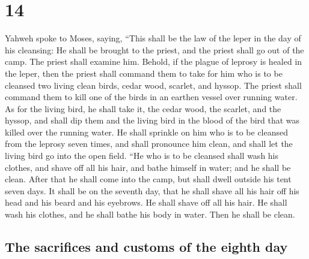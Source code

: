 \hypertarget{section-13}{%
\section{14}\label{section-13}}

 Yahweh spoke to Moses, saying,  ``This
shall be the law of the leper in the day of his cleansing: He shall be
brought to the priest,  and the priest shall go out of the
camp. The priest shall examine him. Behold, if the plague of leprosy is
healed in the leper,  then the priest shall command them
to take for him who is to be cleansed two living clean birds, cedar
wood, scarlet, and hyssop.  The priest shall command them
to kill one of the birds in an earthen vessel over running water.
 As for the living bird, he shall take it, the cedar wood,
the scarlet, and the hyssop, and shall dip them and the living bird in
the blood of the bird that was killed over the running water.
 He shall sprinkle on him who is to be cleansed from the
leprosy seven times, and shall pronounce him clean, and shall let the
living bird go into the open field.  ``He who is to be
cleansed shall wash his clothes, and shave off all his hair, and bathe
himself in water; and he shall be clean. After that he shall come into
the camp, but shall dwell outside his tent seven days.  It
shall be on the seventh day, that he shall shave all his hair off his
head and his beard and his eyebrows. He shall shave off all his hair. He
shall wash his clothes, and he shall bathe his body in water. Then he
shall be clean.

\hypertarget{the-sacrifices-and-customs-of-the-eighth-day}{%
\subsection{The sacrifices and customs of the eighth
day}\label{the-sacrifices-and-customs-of-the-eighth-day}}

